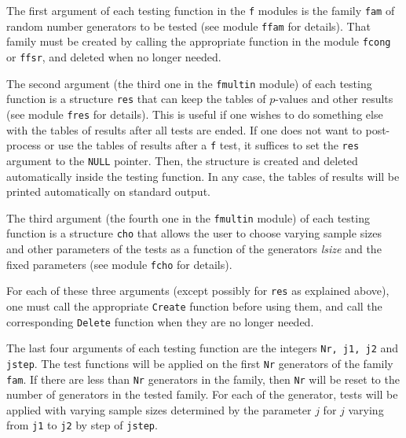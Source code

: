 The first argument of each testing function in the {\tt f} modules
is the family {\tt fam} of random number generators to be tested
(see module {\tt ffam} for details).
That family must be created by calling the  appropriate function in
the module {\tt fcong} or {\tt ffsr}, and deleted when no longer needed.

The second argument (the third one in the {\tt fmultin} module)
of each testing function is a structure {\tt res} that can keep the tables
 of $p$-values and other results (see module {\tt fres} for details).
This is useful if one wishes to do something else with the tables of
results after all tests are ended. If one does not
want to post-process or use the tables of results after a {\tt f} test,
it suffices to set the {\tt res} argument to the {\tt NULL} pointer.
Then, the structure is created and deleted automatically inside the
testing function. In any case, the tables of results will be printed
automatically on standard output.

The third argument (the fourth one in the {\tt fmultin} module)
of each testing function is a structure
{\tt cho} that allows the user to choose varying sample sizes and
other parameters of the tests as a function of the generators {\it lsize}
and the fixed parameters (see module {\tt fcho} for details).

For each of these three arguments (except possibly for {\tt res} as
explained above), one must call the appropriate {\tt Create} function
before using them, and call the corresponding {\tt Delete} function
when they are no longer needed.

The last four arguments of each testing function are the integers
{\tt Nr, j1, j2} and {\tt jstep}. The test functions will be applied on
the first {\tt Nr} generators of the family {\tt fam}.
If there are less than {\tt Nr} generators in the family, then {\tt Nr}
 will be reset to the number of generators in the tested family.
 For each of the generator, tests will be
applied with varying sample sizes determined by the parameter $j$ for
$j$ varying from {\tt j1} to {\tt j2} by step of {\tt jstep}.




